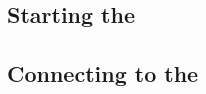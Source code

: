
\label{Agent}


\subsection{Starting the \gdagent{}}
\label{TasksAgentExternal}


\subsection{Connecting to the \gdagent{}}
\label{TasksAgentConnect}



